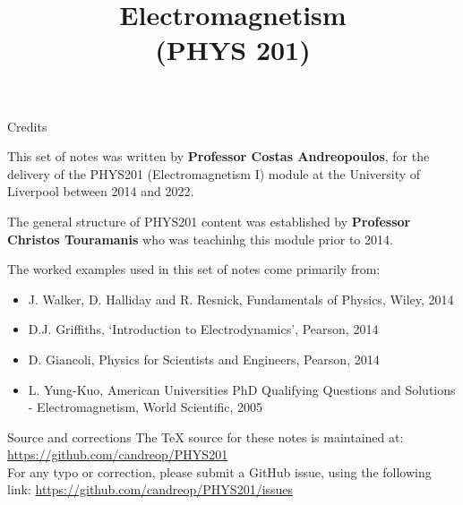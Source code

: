 \renewcommand{\prevlecture}{0}
\renewcommand{\thislecture}{0}
\renewcommand{\nextlecture}{1}

%
%

\title[PHYS 201]
{
  \Huge{Electromagnetism}\\(PHYS 201)\\
}



\begin{frame}[plain]
  \titlepage
\end{frame}


%
%

\begin{frame}{Credits}

{\scriptsize
  This set of notes was written by
  {\bf Professor Costas Andreopoulos},
  for the delivery of the
  PHYS201 (Electromagnetism I) module
  at the University of Liverpool between 2014 and 2022.\\

  \vspace{0.2cm}

  The general structure of PHYS201 content
  was established by {\bf Professor Christos Touramanis}
  who was teachinhg this module prior to 2014.

  \vspace{0.2cm}

  The worked examples used in this set of notes come primarily from:
  \begin{itemize}
    \item J. Walker, D. Halliday and R. Resnick, Fundamentals of Physics, Wiley, 2014
    \item D.J. Griffiths, `Introduction to Electrodynamics', Pearson, 2014
    \item D. Giancoli, Physics for Scientists and Engineers, Pearson, 2014
    \item L. Yung-Kuo, American Universities PhD Qualifying Questions and Solutions - Electromagnetism, World Scientific, 2005\\
  \end{itemize}

  \vspace{0.3cm}

  \begin{block001}{Source and corrections}
  The TeX source for these notes is maintained at:\\
  {\color{blue} \url{https://github.com/candreop/PHYS201}}\\
  \vspace{0.2cm}
  For any typo or correction, please submit a GitHub issue, using
  the following link: {\color{blue} \url{https://github.com/candreop/PHYS201/issues}}
  \end{block001}
}
\end{frame}



